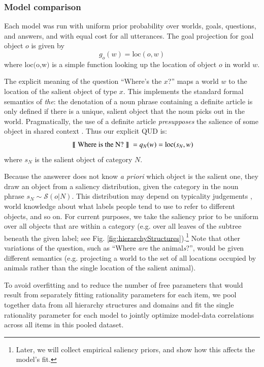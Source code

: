 \documentclass[12pt, floatsintext, jou]{apa6}
\newcommand{\den}[2][]{
\(
\left\llbracket\;\text{#2}\;\right\rrbracket^{#1}
\)
}
\begin{document}
\subsubsection{Model comparison}

Each model was run with uniform prior probability over worlds, goals, questions, and answers, and with equal cost for all utterances. The goal projection for goal object $o$ is given by $$g_o(w) = \textrm{loc}(o,w)$$ where $\textrm{loc(o,w)}$ is a simple function looking up the location of object $o$ in world $w$. 

The explicit meaning of the question ``Where's the $x$?'' maps a world $w$ to the location of the salient object of type $x$. This implements the standard formal semantics of \emph{the}: the denotation of a noun phrase containing a definite article is only defined if there is a unique, salient object that the noun picks out in the world. Pragmatically, the use of a definite article \emph{presupposes} the salience of some object in shared context \cite{Lewis79_Scorekeeping, Roberts03_UniquenessDefiniteNounPhrases}. Thus our explicit QUD is: 
$$\textrm{\den{Where is the N?}} = q_{N}(w) = \textrm{loc}(s_N,w)$$ where $s_N$ is the salient object of category $N$. 

Because the answerer does not know \emph{a priori} which object is the salient one, they draw an object from a saliency distribution, given the category in the noun phrase $s_N \sim \mathcal{S}(o | N)$. This distribution may depend on typicality judgements \cite{Rosch75}, world knowledge about what labels people tend to use to refer to different objects, and so on. For current purposes, we take the saliency prior to be uniform over all objects that are within a category (e.g. over all leaves of the subtree beneath the given label; see Fig. \ref{fig:hierarchyStructures}).\footnote{Later, we will collect empirical saliency priors, and show how this affects the model's fit.} Note that other variations of the question, such as ``Where \emph{are} the animal\emph{s}?'', would be given different semantics (e.g. projecting a world to the set of all locations occupied by animals rather than the single location of the salient animal). 

To avoid overfitting and to reduce the number of free parameters that would result from separately fitting rationality parameters for each item, we pool together data from all hierarchy structures and domains and fit the single rationality parameter for each model to jointly optimize model-data correlations across all items in this pooled dataset. 
\end{document}
